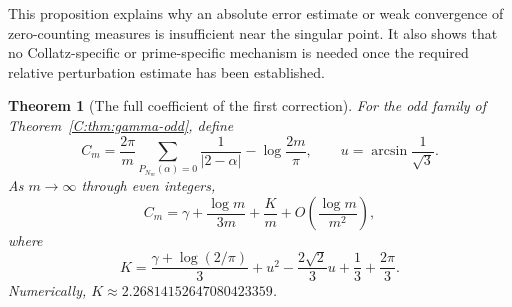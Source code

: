 \documentclass[11pt,a4paper]{article}
\newtheorem{theorem}{Theorem}[section]
\theoremstyle{definition}
\theoremstyle{remark}
\numberwithin{equation}{section}
\begin{document}
This proposition explains why an absolute error estimate or weak
convergence of zero-counting measures is insufficient near the
singular point.  It also shows that no Collatz-specific or prime-specific
mechanism is needed once the required relative perturbation estimate
has been established.

\begin{theorem}[The full coefficient of the first correction]
\label{C:thm:gamma-full-first-correction}
For the odd family of Theorem~\ref{C:thm:gamma-odd}, define
\[
 C_m=\frac{2\pi}{m}\sum_{P_{N_m}(\alpha)=0}\frac1{|2-\alpha|}
            -\log\frac{2m}{\pi},
 \qquad
 u=\arcsin\frac1{\sqrt3}.
\]
As $m\to\infty$ through even integers,
\[
 C_m=\gamma+\frac{\log m}{3m}+\frac{K}{m}
                  +O\!\left(\frac{\log m}{m^2}\right),
\]
where
\[
 \boxed{\displaystyle
 K=\frac{\gamma+\log(2/\pi)}3
       +u^2-\frac{2\sqrt2}{3}u+\frac13+\frac{2\pi}{3}.}
\]
Numerically, $K\approx2.26814152647080423359$.
\end{theorem}
\end{document}
